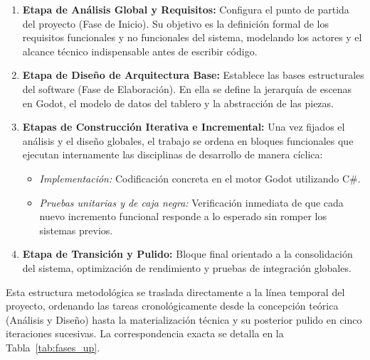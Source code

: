 \begin{enumerate}
	\item \textbf{Etapa de Análisis Global y Requisitos:} Configura el punto de partida del proyecto (Fase de Inicio). Su objetivo es la definición formal de los requisitos funcionales y no funcionales del sistema, modelando los actores y el alcance técnico indispensable antes de escribir código.
	\item \textbf{Etapa de Diseño de Arquitectura Base:} Establece las bases estructurales del software (Fase de Elaboración). En ella se define la jerarquía de escenas en Godot, el modelo de datos del tablero y la abstracción de las piezas.
	\item \textbf{Etapas de Construcción Iterativa e Incremental:} Una vez fijados el análisis y el diseño globales, el trabajo se ordena en bloques funcionales que ejecutan internamente las disciplinas de desarrollo de manera cíclica:
	\begin{itemize}
		\item \textit{Implementación:} Codificación concreta en el motor Godot utilizando C\#.
		\item \textit{Pruebas unitarias y de caja negra:} Verificación inmediata de que cada nuevo incremento funcional responde a lo esperado sin romper los sistemas previos.
	\end{itemize}
	\item \textbf{Etapa de Transición y Pulido:} Bloque final orientado a la consolidación del sistema, optimización de rendimiento y pruebas de integración globales.
\end{enumerate}

Esta estructura metodológica se traslada directamente a la línea temporal del proyecto, ordenando las tareas cronológicamente desde la concepción teórica (Análisis y Diseño) hasta la materialización técnica y su posterior pulido en cinco iteraciones sucesivas. La correspondencia exacta se detalla en la Tabla~\ref{tab:fases_up}.

